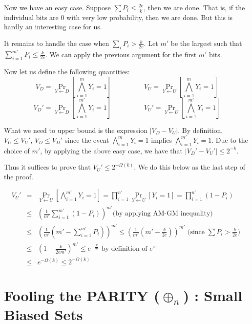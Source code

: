 Now we have an easy case. Suppose $\sum P_i \le \frac{2e}{k}$, then we are done. That is, if the individual bits are $0$ with very low probability, then we are done. But this is hardly an interesting case for us.

It remains to handle the case when $\sum_i P_i > \frac{k}{2e}$. Let $m'$ be the largest such that $\sum_{i=1}^{m'} P_i \le \frac{k}{2e}$. We can apply the previous argument for the first $m'$ bits.

Now let us define the following quantities:
$$ V_D = \Pr_{Y \leftarrow D} \left[ \bigwedge_{i=1}^m Y_i = 1 \right] \hspace{2cm} V_U = \Pr_{Y \leftarrow U} \left[ \bigwedge_{i=1}^m Y_i = 1 \right] $$
$$ V_D' = \Pr_{Y \leftarrow D} \left[ \bigwedge_{i=1}^{m'} Y_i = 1 \right] \hspace{2cm} V_U' = \Pr_{Y \leftarrow U} \left[ \bigwedge_{i=1}^{m'} Y_i = 1 \right] $$

What we need to upper bound is the expression $|V_D - V_U|$.
By definition, $V_U \le V_U'$, $V_D \le V_D'$ since the event $\bigwedge_{i=1}^m Y_i = 1$ implies $\bigwedge_{i=1}^{m'} Y_i = 1$. Due to the choice of $m'$, by applying the above easy case, we have that $|V_D'-V_U'| \le 2^{-k}$.

Thus it suffices to prove that $V_U' \le 2^{-\Omega(k)}$. We do this below as the last step of the proof.

\begin{eqnarray*}
V_U' & = & \Pr_{Y \leftarrow U} \left[ \bigwedge_{i=1}^{m'} Y_i = 1 \right] = \prod_{i=1}^{n'} \Pr_{Y \leftarrow U} \left[ Y_i = 1 \right] = \prod_{i=1}^{n'} \left(1-P_i\right) \\
& \le & \left(\frac{1}{m'} \sum_{i=1}^{m'} (1-P_i) \right)^{m'} \textrm {(by applying AM-GM inequality)} \\
& \le & \left(\frac{1}{m'} \left(m'-\sum_{i=1}^{m'} P_i\right) \right)^{m'} \le \left(\frac{1}{m'} \left(m'-\frac{k}{2e} \right) \right)^{m'} \textrm{ (since $\sum P_i > \frac{k}{2e}$) }\\
& \le & \left(1-\frac{k}{2em'}\right)^{m'} \le e^{-\frac{k}{2e}} \textrm{ by definition of $e^x$ } \\
& \le & e^{-\Omega(k)} \le 2^{-\Omega(k)}
\end{eqnarray*}

\section{Fooling the PARITY ($\oplus_n$) : Small Biased Sets}

